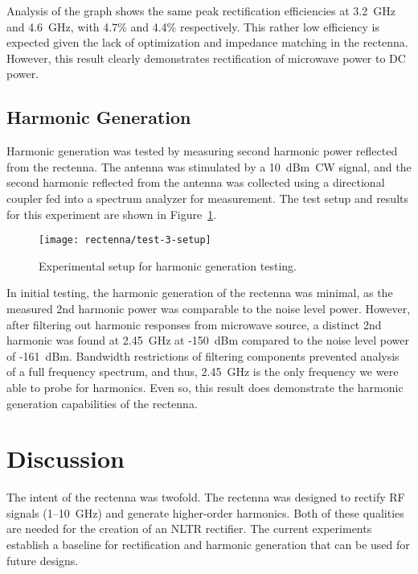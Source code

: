 Analysis of the graph shows the same peak rectification efficiencies at 3.2~GHz and 4.6~GHz, with 4.7\% and 4.4\% respectively. This rather low efficiency is expected given the lack of optimization and impedance matching in the rectenna. However, this result clearly demonstrates rectification of microwave power to DC power.

\subsection{Harmonic Generation}

Harmonic generation was tested by measuring second harmonic power reflected from the rectenna. The antenna was stimulated by a 10~dBm~CW signal, and the second harmonic reflected from the antenna was collected using a directional coupler fed into a spectrum analyzer for measurement. The test setup and results for this experiment are shown in Figure~\ref{fig:rectenna-test-3-setup}.

\begin{figure}[]
\centering
\texttt{[image: rectenna/test-3-setup]}
\caption{Experimental setup for harmonic generation testing.}
\label{fig:rectenna-test-3-setup}
\end{figure}

In initial testing, the harmonic generation of the rectenna was minimal, as the measured 2nd harmonic power was comparable to the noise level power. However, after filtering out harmonic responses from microwave source, a distinct 2nd harmonic was found at 2.45~GHz at -150~dBm compared to the noise level power of -161~dBm. Bandwidth restrictions of filtering components prevented analysis of a full frequency spectrum, and thus, 2.45~GHz is the only frequency we were able to probe for harmonics. Even so, this result does demonstrate the harmonic generation capabilities of the rectenna.

\section{Discussion}
\label{sec:rectenna-discussion}

The intent of the rectenna was twofold. The rectenna was designed to rectify RF signals (\numrange{1}{10}~GHz) and generate higher-order harmonics. Both of these qualities are needed for the creation of an NLTR rectifier. The current experiments establish a baseline for rectification and harmonic generation that can be used for future designs.

